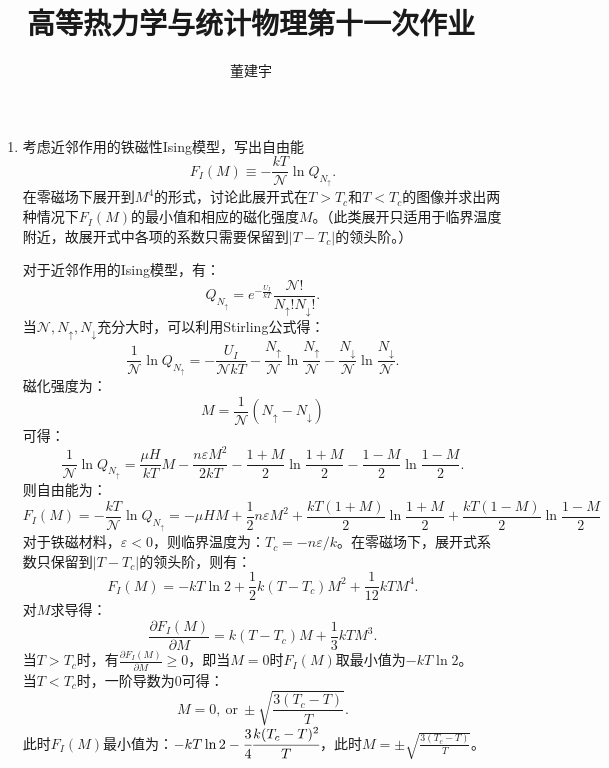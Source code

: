 \documentclass[reqno,a4paper,12pt]{amsart}
\title{高等热力学与统计物理第十一次作业}
\author{董建宇}
\begin{document}
\maketitle

\begin{enumerate}[1.]

\item 考虑近邻作用的铁磁性Ising模型，写出自由能
\[
	F_I(M) \equiv -\frac{kT}{\mathcal{N}} \ln Q_{N_\uparrow}.
\]
在零磁场下展开到$M^4$的形式，讨论此展开式在$T>T_c$和$T<T_c$的图像并求出两种情况下$F_I(M)$的最小值和相应的磁化强度$M$。（此类展开只适用于临界温度附近，故展开式中各项的系数只需要保留到$\vert T-T_c \vert$的领头阶。）
\begin{tcolorbox}[breakable, colframe = black, colback = black!5!white]
对于近邻作用的Ising模型，有：
\[
	Q_{N_\uparrow} = e^{-\frac{U_I}{kT}} \frac{\mathcal{N}!}{N_\uparrow!N_\downarrow!}.
\]
当$\mathcal{N},N_\uparrow,N_\downarrow$充分大时，可以利用Stirling公式得：
\[
	\frac{1}{\mathcal{N}}\ln Q_{N_\uparrow} = -\frac{U_I}{\mathcal{N}kT} - \frac{N_\uparrow}{\mathcal{N}} \ln\frac{N_\uparrow}{\mathcal{N}} - \frac{N_\downarrow}{\mathcal{N}} \ln\frac{N_\downarrow}{\mathcal{N}}.
\]
磁化强度为：
\[
	M = \frac{1}{\mathcal{N}}(N_\uparrow-N_\downarrow)
\]
可得：
\[
	\frac{1}{\mathcal{N}}\ln Q_{N_\uparrow} = \frac{\mu H}{kT}M -\frac{n\varepsilon M^2}{2kT} - \frac{1+M}{2}\ln\frac{1+M}{2} - \frac{1-M}{2}\ln\frac{1-M}{2}.
\]
则自由能为：
\[
	F_I(M) = -\frac{kT}{\mathcal{N}}\ln Q_{N_\uparrow} = -\mu HM + \frac{1}{2}n\varepsilon M^2 + \frac{kT(1+M)}{2}\ln\frac{1+M}{2} + \frac{kT(1-M)}{2}\ln\frac{1-M}{2}
\]
对于铁磁材料，$\varepsilon<0$，则临界温度为：$T_c = -n\varepsilon/k$。在零磁场下，展开式系数只保留到$\vert T - T_c \vert$的领头阶，则有：
\[
	F_I(M) = -kT\ln2 + \frac{1}{2}k(T-T_c) M^2 + \frac{1}{12}kT M^4.
\]
对$M$求导得：
\[
	\frac{\partial F_I(M)}{\partial M} = k(T-T_c)M + \frac{1}{3}kTM^3.
\]
当$T>T_c$时，有$\frac{\partial F_I(M)}{\partial M} \geq 0$，即当$M = 0$时$F_I(M)$取最小值为$-kT\ln2$。 \\
当$T<T_c$时，一阶导数为0可得：
\[
	M = 0,~\text{or}~\pm\sqrt{\frac{3(T_c-T)}{T}}.
\]
此时$F_I(M)$最小值为：$-kT\ln2-\cfrac{3}{4}\cfrac{k(T_c-T)^2}{T}$，此时$M = \pm \sqrt{\frac{3(T_c-T)}{T}}$。

\end{tcolorbox}



\end{enumerate}
\end{document}
